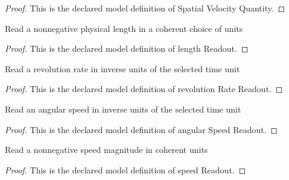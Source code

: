 \begin{proof}
  This is the declared model definition of Spatial Velocity Quantity.
\end{proof}
\begin{definition}
  \label{def:physics:phyx-mini-0818:phyxminiproblems-problemphyxmini0818-lengthreadout}
  Read a nonnegative physical length in a coherent choice of units
\end{definition}
\begin{proof}
  This is the declared model definition of length Readout.
\end{proof}
\begin{definition}
  \label{def:physics:phyx-mini-0818:phyxminiproblems-problemphyxmini0818-revolutionratereadout}
  Read a revolution rate in inverse units of the selected time unit
\end{definition}
\begin{proof}
  This is the declared model definition of revolution Rate Readout.
\end{proof}
\begin{definition}
  \label{def:physics:phyx-mini-0818:phyxminiproblems-problemphyxmini0818-angularspeedreadout}
  Read an angular speed in inverse units of the selected time unit
\end{definition}
\begin{proof}
  This is the declared model definition of angular Speed Readout.
\end{proof}
\begin{definition}
  \label{def:physics:phyx-mini-0818:phyxminiproblems-problemphyxmini0818-speedreadout}
  Read a nonnegative speed magnitude in coherent units
\end{definition}
\begin{proof}
  This is the declared model definition of speed Readout.
\end{proof}
